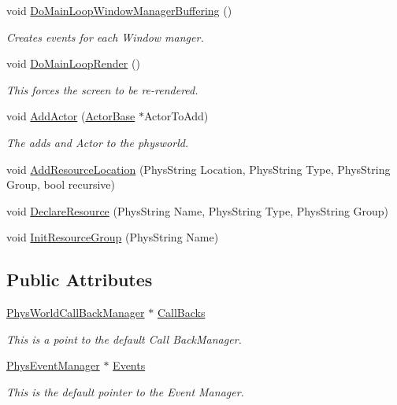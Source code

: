 \begin{DoxyCompactItemize}
void \hyperlink{classPhysWorld_ae81bab7f314d98f7b787c508e60c9c9a}{DoMainLoopWindowManagerBuffering} ()
\begin{DoxyCompactList}\small\item\em Creates events for each Window manger. \item\end{DoxyCompactList}\item 
void \hyperlink{classPhysWorld_a8f33541d67164a2452e568443e9905be}{DoMainLoopRender} ()
\begin{DoxyCompactList}\small\item\em This forces the screen to be re-\/rendered. \item\end{DoxyCompactList}\item 
void \hyperlink{classPhysWorld_ae490054b3e1c4c5aa69cb8e3b7bd2f29}{AddActor} (\hyperlink{classActorBase}{ActorBase} $\ast$ActorToAdd)
\begin{DoxyCompactList}\small\item\em The adds and Actor to the physworld. \item\end{DoxyCompactList}\item 
void \hyperlink{classPhysWorld_a757783fa596bda8ebdbc24234c6b621a}{AddResourceLocation} (PhysString Location, PhysString Type, PhysString Group, bool recursive)
\item 
void \hyperlink{classPhysWorld_a908c21f7f5452f8d7c6d4b5b2308ba5e}{DeclareResource} (PhysString Name, PhysString Type, PhysString Group)
\item 
void \hyperlink{classPhysWorld_a0b67df4c76c32b9b2bdcafdc51f6aba7}{InitResourceGroup} (PhysString Name)
\end{DoxyCompactItemize}
\subsection*{Public Attributes}
\begin{DoxyCompactItemize}
\item 
\hyperlink{classPhysWorldCallBackManager}{PhysWorldCallBackManager} $\ast$ \hyperlink{classPhysWorld_a080ea6f1584374b07d3c1f29c7ed64df}{CallBacks}
\begin{DoxyCompactList}\small\item\em This is a point to the default Call BackManager. \item\end{DoxyCompactList}\item 
\hyperlink{classPhysEventManager}{PhysEventManager} $\ast$ \hyperlink{classPhysWorld_a601b3c6093aaf2a69fcd3311dde9aadc}{Events}
\begin{DoxyCompactList}\small\item\em This is the default pointer to the Event Manager. \item\end{DoxyCompactList}\end{DoxyCompactItemize}
